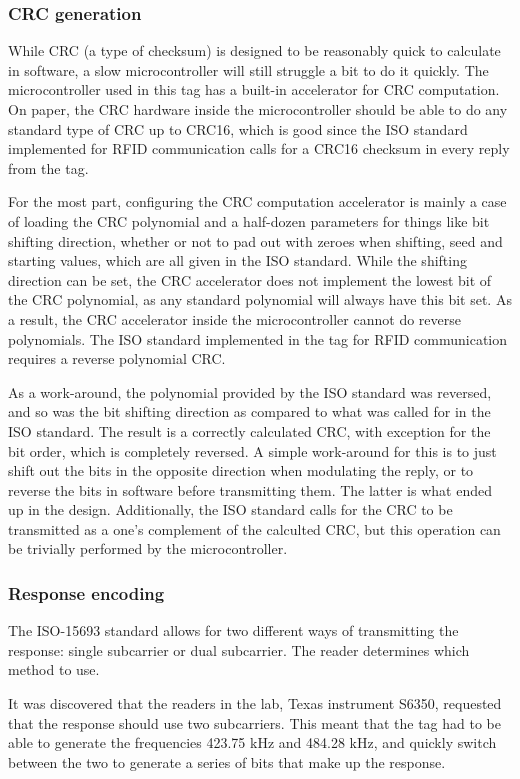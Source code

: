 \subsubsection{CRC generation}
While CRC (a type of checksum) is designed to be reasonably quick to calculate in software,
a slow microcontroller will still struggle a bit to do it quickly. The microcontroller used in this
tag has a built-in accelerator for CRC computation. On paper, the CRC hardware inside the microcontroller
should be able to do any standard type of CRC up to CRC16, which is good since the ISO standard
implemented for RFID communication calls for a CRC16 checksum in every reply from the tag.

For the most part, configuring the CRC computation accelerator is mainly a case of loading the
CRC polynomial and a half-dozen parameters for things like bit shifting direction, whether or not to pad
out with zeroes when shifting, seed and starting values, which are all given in the ISO standard.
While the shifting direction can be set, the CRC
accelerator does not implement the lowest bit of the CRC polynomial, as any standard polynomial will always have
this bit set. As a result, the CRC accelerator inside the microcontroller cannot do reverse polynomials.
The ISO standard implemented in the tag for RFID communication requires a reverse polynomial CRC.

As a work-around, the polynomial provided by the ISO standard was reversed, and so was the bit shifting
direction as compared to what was called for in the ISO standard. The result is a correctly calculated
CRC, with exception for the bit order, which is completely reversed. A simple work-around for this is to
just shift out the bits in the opposite direction when modulating the reply, or to reverse the bits
in software before transmitting them. The latter is what ended up in the design. Additionally, the ISO standard
calls for the CRC to be transmitted as a one's complement of the calculted CRC, but this operation
can be trivially performed by the microcontroller.


\subsubsection{Response encoding}
The ISO-15693 standard allows for two different ways of transmitting the response: single subcarrier or dual subcarrier.\cite{rfid-iso}
The reader determines which method to use.

It was discovered that the readers in the lab, Texas instrument S6350, requested that the response should use two subcarriers.
This meant that the tag had to be able to generate the frequencies 423.75 kHz and 484.28 kHz, and quickly switch between the two to generate a series of bits that make up the response.

